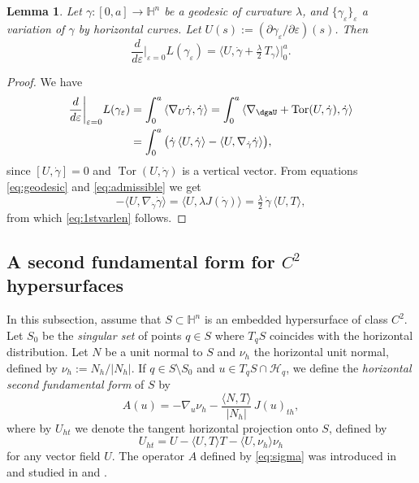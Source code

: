 \documentclass[10pt]{amsart}
\newtheorem{lemma}[theorem]{Lemma}
\theoremstyle{definition}
\theoremstyle{remark}
\numberwithin{equation}{section}
\begin{document}
\begin{lemma}
\label{lem:1stvarlen}
Let ${\gamma}:[0,a]\to{{\mathbb{H}}}^n$ be a geodesic of curvature ${\lambda}$, and $\{{\gamma}_{\varepsilon}\}_{\varepsilon}$ a variation of ${\gamma}$ by horizontal curves. Let $U(s):=({\partial}{\gamma}_{\varepsilon}/{\partial}{\varepsilon})(s)$. Then
\begin{equation}
\label{eq:1stvarlen}
\frac{d}{d{\varepsilon}}\bigg|_{{\varepsilon}=0} L({\gamma}_{\varepsilon})={\langle{U,\dot{\gamma}+\tfrac{\lambda}{2}\,T_{\gamma}}\rangle}\big|_{0}^{a}.
\end{equation}
\end{lemma}

\begin{proof}
We have
\begin{align*}
\frac{d}{d{\varepsilon}}\bigg|_{{\varepsilon}=0} L({\gamma}_{\varepsilon})&=\int_{0}^{a} {\langle{\nabla_{U}\dot{\gamma},\dot{\gamma}}\rangle}
=\int_{0}^{a} {\langle{\nabla_\dgaU+\operatorname{Tor}(U,{\dot{\gamma}}),{\dot{\gamma}}}\rangle}
\\
&=\int_{0}^{a}
\big(\dot{\gamma}\,{\langle{U,\dot{\gamma}}\rangle}-{\langle{U,\nabla_{\dot{\gamma}}\dot{\gamma}}\rangle}\big),
\end{align*}
since $[U,{\dot{\gamma}}]=0$ and $\operatorname{Tor}(U,{\dot{\gamma}})$ is a vertical vector. From equations \eqref{eq:geodesic} and \eqref{eq:admissible} we get
\[
-{\langle{U,\nabla_{\dot{\gamma}}{\dot{\gamma}}}\rangle}={\langle{U,{\lambda} J({\dot{\gamma}})}\rangle}=\tfrac{\lambda}{2}\,{\dot{\gamma}}\,{\langle{U,T}\rangle},
\]
from which \eqref{eq:1stvarlen} follows.
\end{proof}

\subsection{A second fundamental form for $C^2$ hypersurfaces}
\label{sec:hor2nd}
In this subsection, assume that $S\subset{{\mathbb{H}}}^n$ is an embedded hypersurface of class $C^2$. Let $S_0$ be the \emph{singular set} of points $q\in S$ where $T_qS$ coincides with the horizontal distribution. Let $N$ be a unit normal to $S$ and ${\nu_{h}}$ the horizontal unit normal, defined by ${\nu_{h}}:=N_h/|N_h|$. If $q\in S\setminus S_0$ and $u\in T_qS\cap{\mathcal{H}}_q$, we define the \emph{horizontal second fundamental form} of $S$ by 
\begin{equation}
\label{eq:sigma}
A(u)=-\nabla_u{\nu_{h}}-{\frac{{\langle{N,T}\rangle}}{|N_h|}}\,J(u)_{th},
\end{equation}
where by $U_{ht}$ we denote the tangent horizontal projection onto $S$, defined by
\[
U_{ht}=U-{\langle{U,T}\rangle}T-{\langle{U,{\nu_{h}}}\rangle}{\nu_{h}}
\]
for any vector field $U$. The operator $A$ defined by \eqref{eq:sigma} was introduced in \cite{MR2898770} and studied in \cite{cchy} and \cite{MR3504195} . 
\end{document}
